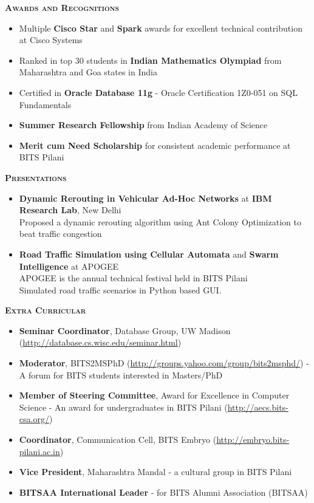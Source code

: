\documentclass[11pt]{article}
\newcommand{\graybox}[1]{\begin{mdframed}[backgroundcolor=light-gray, linecolor=light-gray, roundcorner=10pt, shadow=false, shadowsize=1pt]
\Large{\textbf{\textsc{#1}}}
\end{mdframed}}
\begin{document}
\graybox{Awards and Recognitions}
\begin{itemize}\addtolength{\itemsep}{-0.5\baselineskip}
	\item{Multiple \textbf{Cisco Star} and \textbf{Spark} awards for excellent technical contribution at Cisco Systems}
	\item{Ranked in top 30 students in \textbf{Indian Mathematics Olympiad} from Maharashtra and Goa states in India}
	\item{Certified in \textbf{Oracle Database 11g} - Oracle Certification 1Z0-051 on SQL Fundamentals}
	\item{\textbf{Summer Research Fellowship} from Indian Academy of Science}
	\item{\textbf{Merit cum Need Scholarship} for consistent academic performance at BITS Pilani}
\end{itemize}
\graybox{Presentations}
\begin{itemize}\addtolength{\itemsep}{-0.5\baselineskip}
	\item{\textbf{Dynamic Rerouting in Vehicular Ad-Hoc Networks} at \textbf{IBM Research Lab}, New Delhi}\\
	\textendash Proposed a dynamic rerouting algorithm using Ant Colony Optimization to beat traffic congestion\\
	\item{\textbf{Road Traffic Simulation using Cellular Automata} and \textbf{Swarm Intelligence} at APOGEE}\\
	\textendash APOGEE is the annual technical festival held in BITS Pilani\\
	\textendash Simulated road traffic scenarios in Python based GUI.
\end{itemize}
\graybox{Extra Curricular}
\begin{itemize}\addtolength{\itemsep}{-0.5\baselineskip}
	\item{\textbf{Seminar Coordinator}, Database Group, UW Madison (\url{http://database.cs.wisc.edu/seminar.html})}
	\item{\textbf{Moderator}, BITS2MSPhD (\url{http://groups.yahoo.com/group/bits2msphd/}) - A forum for BITS students interested in Masters/PhD}
	\item{\textbf{Member of Steering Committee},  Award for Excellence in Computer Science - An award for undergraduates in BITS Pilani (\url{http://aecs.bits-csa.org/})}
	\item{\textbf{Coordinator}, Communication Cell, BITS Embryo (\url{http://embryo.bits-pilani.ac.in})}
	\item{\textbf{Vice President}, Maharashtra Mandal - a cultural group in BITS Pilani}
	\item{\textbf{BITSAA International Leader} - for BITS Alumni Association (BITSAA)}
\end{itemize}
\end{document}
